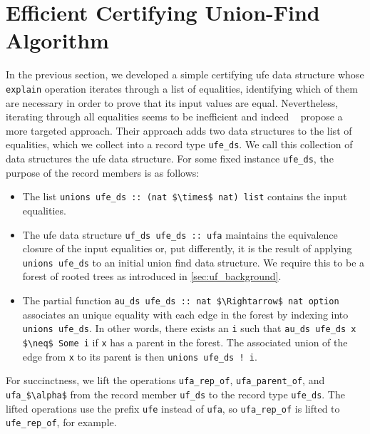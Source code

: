 \documentclass[
  sigplan,
  10pt,
  anonymous,
  review,
  ]{acmart}
\begin{document}
\section{Efficient Certifying Union-Find Algorithm}
In the previous section, we developed a simple certifying \acrfull{ufe} data structure whose \lstinline|explain| operation iterates through a list of equalities,
identifying which of them are necessary in order to prove that its input values are equal.
Nevertheless, iterating through all equalities seems to be inefficient and indeed \citeauthor{congcl_proofs}~\cite{congcl_proofs} propose a more targeted approach.
Their approach adds two data structures to the list of equalities, which we collect into a record type \lstinline|ufe_ds|.
We call this collection of data structures the \acrshort{ufe} data structure.
For some fixed instance \lstinline|ufe_ds|, the purpose of the record members is as follows:
\begin{itemize}
  \item The list \lstinline|unions ufe_ds :: (nat $\times$ nat) list| contains the input equalities.
  \item The \acrshort{ufe} data structure \lstinline|uf_ds ufe_ds :: ufa| maintains the equivalence closure of the input equalities or, put differently, it is the result of applying \lstinline|unions ufe_ds| to an initial union find data structure.
    We require this to be a forest of rooted trees as introduced in \autoref{sec:uf_background}.
  \item The partial function \lstinline|au_ds ufe_ds :: nat $\Rightarrow$ nat option| associates an unique equality with each edge in the forest by indexing into \lstinline|unions ufe_ds|.
    In other words, there exists an \lstinline|i| such that \lstinline|au_ds ufe_ds x $\neq$ Some i| if \lstinline|x| has a parent in the forest.
    The associated union of the edge from \lstinline|x| to its parent is then \lstinline|unions ufe_ds ! i|.
\end{itemize}
For succinctness, we lift the operations \lstinline|ufa_rep_of|, \lstinline|ufa_parent_of|, and \lstinline|ufa_$\alpha$| from the record member \lstinline|uf_ds| to the record type \lstinline|ufe_ds|.
The lifted operations use the prefix \lstinline|ufe| instead of \lstinline|ufa|, so \lstinline|ufa_rep_of| is lifted to \lstinline|ufe_rep_of|, for example.
\end{document}
